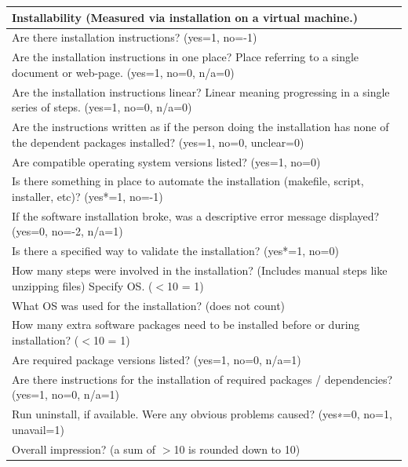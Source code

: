\documentclass[12pt, notitlepage]{article}
\begin{document}
\begin{singlespace}
\label{gradingtemplate}
\def\arraystretch{1.5}
\begin{tabular}{p{16cm}}
	\hline		
	\textbf{Installability  (Measured via installation on a virtual machine.) }\\
	\hline
	Are there installation instructions? ({yes=1, no=-1})\\
	Are the installation instructions in one place? Place referring to a single document or web-page. ({yes=1, no=0, n/a=0})\\
	Are the installation instructions linear? Linear meaning progressing  in a single series of steps. ({yes=1, no=0, n/a=0})\\
	Are the instructions written as if the person doing the installation has none of the dependent packages installed? ({yes=1, no=0, unclear=0})\\
	Are compatible operating system versions listed? ({yes=1, no=0})\\
	Is there something in place to automate the installation (makefile, script, installer, etc)? ({yes*=1, no=-1})\\
	If the software installation broke, was a descriptive error message displayed? ({yes=0, no=-2, n/a=1})\\
	Is there a specified way to validate the installation? ({yes*=1, no=0})\\
	How many steps were involved in the installation? (Includes manual steps like unzipping files) Specify OS. ($<$10 = 1)\\
	What OS was used for the installation? (does not count)\\
	How many extra software packages need to be installed before or during installation? ($<$10 = 1)\\
	Are required package versions listed? ({yes=1, no=0, n/a=1})\\
	Are there instructions for the installation of required packages / dependencies? ({yes=1, no=0, n/a=1})\\
	Run uninstall, if available. Were any obvious problems caused? ({yes∗=0, no=1, unavail=1})\\
	Overall impression? (a sum of $>$10 is rounded down to 10)\\
	\hline
\end{tabular}


\end{singlespace}
\end{document}
